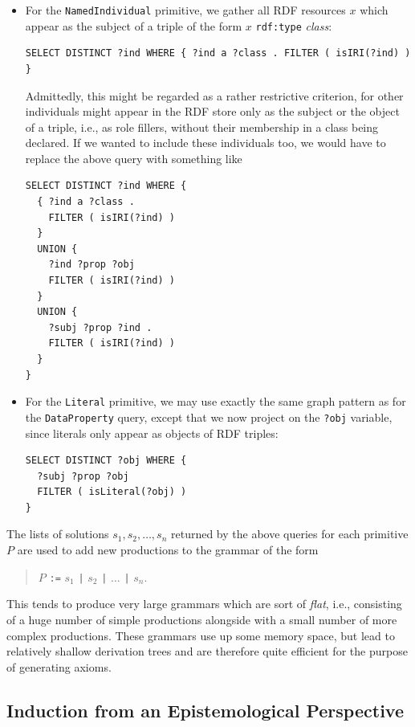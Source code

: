 \documentclass[a4paper]{article}
\newcounter{ex}
\begin{document}
\begin{itemize}
\item For the \texttt{NamedIndividual} primitive, we gather all RDF resources $x$ which
appear as the subject of a triple of the form $x$ \texttt{rdf:type} \textit{class}:
\begin{verbatim}
SELECT DISTINCT ?ind WHERE { ?ind a ?class . FILTER ( isIRI(?ind) ) }\end{verbatim}
Admittedly, this might be regarded as a rather restrictive criterion, for other individuals
might appear in the RDF store only as the subject or the object of a triple, i.e., as role fillers, without
their membership in a class being declared. If we wanted to include these individuals too,
we would have to replace the above query with something like
\begin{verbatim}
SELECT DISTINCT ?ind WHERE {
  { ?ind a ?class .
    FILTER ( isIRI(?ind) )
  }
  UNION {
    ?ind ?prop ?obj
    FILTER ( isIRI(?ind) )
  }
  UNION {
    ?subj ?prop ?ind .
    FILTER ( isIRI(?ind) )
  }
}\end{verbatim}

\item For the \texttt{Literal} primitive, we may use exactly the same graph pattern as for
the \texttt{DataProperty} query, except that we now project on the \texttt{?obj} variable,
since literals only appear as objects of RDF triples:
\begin{verbatim}
SELECT DISTINCT ?obj WHERE {
  ?subj ?prop ?obj
  FILTER ( isLiteral(?obj) )
}\end{verbatim}

\end{itemize}
The lists of solutions $s_1, s_2, \ldots, s_n$ returned by the above queries
for each primitive $P$ are used to add new productions to the grammar of the form
\begin{quote}
  $P$ \texttt{:=} $s_1$ \texttt{|} $s_2$ \texttt{|} $\ldots$ \texttt{|} $s_n$.
\end{quote}
This tends to produce very large grammars which are sort of \emph{flat}, i.e., consisting of
a huge number of simple productions alongside with a small number of more complex productions.
These grammars use up some memory space, but lead to relatively shallow derivation trees
and are therefore quite efficient for the purpose of generating axioms.

\subsection{Induction from an Epistemological Perspective}
\label{epistemology}
\end{document}
